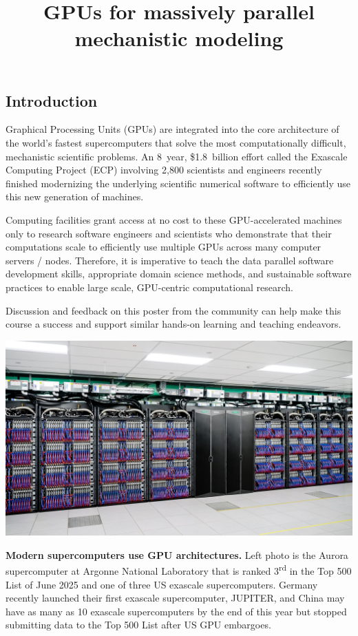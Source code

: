 \documentclass{article}
\title{GPUs for massively parallel mechanistic modeling}
\newcommand{\sectionbox}[1]{%
  \begin{tcolorbox}[sharp corners,boxrule=0pt,top=15pt,colback=fh-blue,coltext=fh-gold]%
    \section*{#1\vphantom{Yy}}%
  \end{tcolorbox}%
}
\begin{document}
\begin{multicols}{2}

  \sectionbox{Introduction}%
  \noindent
  Graphical Processing Units (GPUs) %
  are integrated into the core architecture %
  of the world's fastest supercomputers %
  that solve the most computationally difficult, %
  mechanistic scientific problems.
  An 8~year, \$1.8~billion effort %
  called the Exascale Computing Project (ECP) %
  involving 2,800 scientists and engineers %
  recently finished modernizing %
  the underlying scientific numerical software %
  to efficiently use this new generation of machines.
  \smallskip

  \noindent
  Computing facilities grant access at no cost %
  to these GPU-accelerated%
  \supercite{%
    carter_2014,%
    beckingsale_2019,%
    reinders_2023%
  } machines %
  only to research software engineers and scientists who demonstrate that %
  their computations scale %
  to efficiently use multiple GPUs across many computer servers / nodes.
  Therefore, %
  it is imperative to teach %
  the data parallel software development skills, %
  appropriate domain science methods, and %
  sustainable software practices %
  to enable large scale, GPU-centric computational research.
  \smallskip

  \noindent
  Discussion and feedback on this poster from the community %
  can help make this course a success and %
  support similar hands-on learning and teaching endeavors.
  \smallskip

  \noindent
  \begin{minipage}[c]{.36\linewidth}
    \includegraphics[width=\linewidth]{1920x1080-Aurora hero image.jpg}
  \end{minipage}
  \begin{minipage}[c]{.62\linewidth}
    \textbf{Modern supercomputers use GPU architectures.}
    Left photo is the Aurora supercomputer at Argonne National Laboratory %
    that is ranked 3\textsuperscript{rd} in the Top 500 List of June 2025 %
    and one of three US exascale supercomputers.
    Germany recently launched their first exascale supercomputer, JUPITER, %
    and China may have as many as 10 exascale supercomputers %
    by the end of this year\supercite{dongarra_2023} %
    but stopped submitting data to the Top 500 List %
    after US GPU embargoes.
  \end{minipage}
  \vspace{\baselineskip}


\end{multicols}
\end{document}
